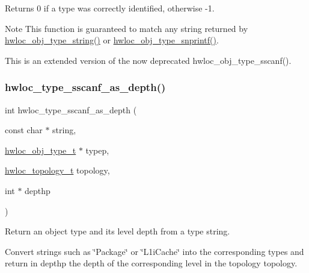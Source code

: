\begin{DoxyReturn}{Returns}
0 if a type was correctly identified, otherwise -\/1.
\end{DoxyReturn}
\begin{DoxyNote}{Note}
This function is guaranteed to match any string returned by \hyperlink{a00188_ga5ca0bf94bbbb080d0eff17a57bd90422}{hwloc\+\_\+obj\+\_\+type\+\_\+string()} or \hyperlink{a00188_gadb8765c260edea80c52cd06a76639ba4}{hwloc\+\_\+obj\+\_\+type\+\_\+snprintf()}.

This is an extended version of the now deprecated hwloc\+\_\+obj\+\_\+type\+\_\+sscanf(). 
\end{DoxyNote}
\mbox{\label{a00188_ga52c63cd7203e55b804c1314affc9bd12}} 
\subsubsection{\texorpdfstring{hwloc\+\_\+type\+\_\+sscanf\+\_\+as\+\_\+depth()}{hwloc\_type\_sscanf\_as\_depth()}}
{\footnotesize\ttfamily int hwloc\+\_\+type\+\_\+sscanf\+\_\+as\+\_\+depth (\begin{DoxyParamCaption}\item[{const char $\ast$}]{string,  }\item[{\hyperlink{a00184_gacd37bb612667dc437d66bfb175a8dc55}{hwloc\+\_\+obj\+\_\+type\+\_\+t} $\ast$}]{typep,  }\item[{\hyperlink{a00186_ga9d1e76ee15a7dee158b786c30b6a6e38}{hwloc\+\_\+topology\+\_\+t}}]{topology,  }\item[{int $\ast$}]{depthp }\end{DoxyParamCaption})}



Return an object type and its level depth from a type string. 

Convert strings such as \char`\"{}\+Package\char`\"{} or \char`\"{}\+L1i\+Cache\char`\"{} into the corresponding types and return in {\ttfamily depthp} the depth of the corresponding level in the topology {\ttfamily topology}.

